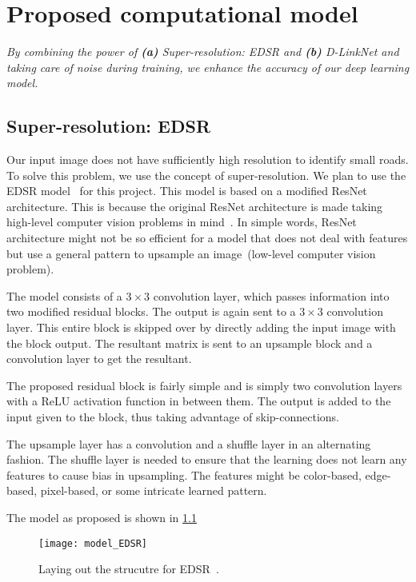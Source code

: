 \chapter{Proposed computational model}\label{chapt:model}
\textit{By combining the power of \textbf{(a)} Super-resolution: EDSR and \textbf{(b)} D-LinkNet and taking care of noise during training, we enhance the accuracy of our deep learning model.}

\section{Super-resolution: EDSR}
Our input image does not have sufficiently high resolution to identify small roads. To solve this problem, we use the concept of super-resolution. We plan to use the EDSR model~\cite{EDSR} for this project. This model is based on a modified ResNet architecture. This is because the original ResNet architecture is made taking high-level computer vision problems in mind~\cite{khan2019surveyResNet}. In simple words, ResNet architecture might not be so efficient for a model that does not deal with features but use a general pattern to upsample an image~(low-level computer vision problem). 

The model consists of a $3\times3$ convolution layer, which passes information into two modified residual blocks. The output is again sent to a $3\times3$ convolution layer. This entire block is skipped over by directly adding the input image with the block output. The resultant matrix is sent to an upsample block and a convolution layer to get the resultant.

The proposed residual block is fairly simple and is simply two convolution layers with a ReLU activation function in between them. The output is added to the input given to the block, thus taking advantage of skip-connections.

The upsample layer has a convolution and a shuffle layer in an alternating fashion. The shuffle layer is needed to ensure that the learning does not learn any features to cause bias in upsampling. The features might be color-based, edge-based, pixel-based, or some intricate learned pattern.

The model as proposed is shown in \cref{fig:model_EDSR}

\begin{figure}[h!]
  \centering
  \texttt{[image: model\_EDSR]}
  \caption[Laying out the strucutre for EDSR]{Laying out the strucutre for EDSR~\cite{EDSR}.}
  \label{fig:model_EDSR}
\end{figure}


